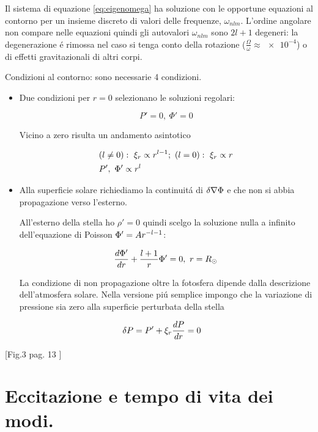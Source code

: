 \documentclass[../main.tex]{subfiles}
\begin{document}
Il sistema di equazione \eqref{eq:eigenomega} ha soluzione con le opportune equazioni al contorno per un insieme discreto di valori delle frequenze, $\omega_{nlm}$. L'ordine angolare non compare nelle equazioni quindi gli autovalori $\omega_{nlm}$ sono $2l+1$ degeneri: la degenerazione \'e rimossa nel caso si tenga conto della rotazione ($\frac{\Omega}{\omega}\approx\num{e-4}$) o di effetti gravitazionali di altri corpi.


Condizioni al contorno: sono necessarie 4 condizioni.

\begin{itemize}
\item Due condizioni per $r=0$ selezionano le soluzioni regolari:

\begin{equation}
P'=0,\ \Phi'=0
\end{equation}

Vicino a zero risulta un andamento asintotico

\begin{align*}
&(l\neq0):\ \xi_r\propto r\expy{l-1};\ (l=0):\ \xi_r\propto r\\
&P',\ \Phi'\propto r^l
\end{align*}

\item Alla superficie solare richiediamo la continuit\'a di $\Lvar{\nabla\Phi}$ e che non si abbia propagazione verso l'esterno.

All'esterno della stella ho $\rho'=0$ quindi scelgo la soluzione nulla a infinito dell'equazione di Poisson $\Phi'=Ar\expy{-l-1}$:

\begin{equation}
\TDy{r}{\Phi'}+\frac{l+1}{r}\Phi'=0,\ r=\rsun{}    
\end{equation}

La condizione di non propagazione oltre la fotosfera dipende dalla descrizione dell'atmosfera solare. Nella versione pi\'u semplice impongo che la variazione di pressione sia zero alla superficie perturbata della stella

\begin{align}
&\Lvar{P}=P'+\xi_r\TDy{r}{P}=0
\end{align}

\end{itemize}

[Fig.3 pag. 13 \cite{chr02helioseismology}]


\section{Eccitazione e tempo di vita dei modi.}
\end{document}
